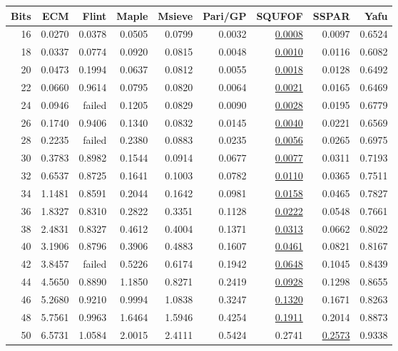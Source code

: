 \documentclass{ucalgthes1}
\theoremstyle{definition}
\begin{document}
\begin{table}[htb]
\centering
\begin{tabular}{| r | r | r | r | r | r | r | r | r |}
	\hline
Bits & ECM & Flint & Maple & Msieve & Pari/GP & SQUFOF & SSPAR & Yafu \\
	\hline
16 & 0.0270 & 0.0378 & 0.0505 & 0.0799 & 0.0032 & \underline{0.0008} & 0.0097 & 0.6524 \\
18 & 0.0337 & 0.0774 & 0.0920 & 0.0815 & 0.0048 & \underline{0.0010} & 0.0116 & 0.6082 \\
20 & 0.0473 & 0.1994 & 0.0637 & 0.0812 & 0.0055 & \underline{0.0018} & 0.0128 & 0.6492 \\
22 & 0.0660 & 0.9614 & 0.0795 & 0.0820 & 0.0064 & \underline{0.0021} & 0.0165 & 0.6469 \\
24 & 0.0946 & failed & 0.1205 & 0.0829 & 0.0090 & \underline{0.0028} & 0.0195 & 0.6779 \\
26 & 0.1740 & 0.9406 & 0.1340 & 0.0832 & 0.0145 & \underline{0.0040} & 0.0221 & 0.6569 \\
28 & 0.2235 & failed & 0.2380 & 0.0883 & 0.0235 & \underline{0.0056} & 0.0265 & 0.6975 \\
30 & 0.3783 & 0.8982 & 0.1544 & 0.0914 & 0.0677 & \underline{0.0077} & 0.0311 & 0.7193 \\
32 & 0.6537 & 0.8725 & 0.1641 & 0.1003 & 0.0782 & \underline{0.0110} & 0.0365 & 0.7511 \\
34 & 1.1481 & 0.8591 & 0.2044 & 0.1642 & 0.0981 & \underline{0.0158} & 0.0465 & 0.7827 \\
36 & 1.8327 & 0.8310 & 0.2822 & 0.3351 & 0.1128 & \underline{0.0222} & 0.0548 & 0.7661 \\
38 & 2.4831 & 0.8327 & 0.4612 & 0.4004 & 0.1371 & \underline{0.0313} & 0.0662 & 0.8022 \\
40 & 3.1906 & 0.8796 & 0.3906 & 0.4883 & 0.1607 & \underline{0.0461} & 0.0821 & 0.8167 \\
42 & 3.8457 & failed & 0.5226 & 0.6174 & 0.1942 & \underline{0.0648} & 0.1045 & 0.8439 \\
44 & 4.5650 & 0.8890 & 1.1850 & 0.8271 & 0.2419 & \underline{0.0928} & 0.1298 & 0.8655 \\
46 & 5.2680 & 0.9210 & 0.9994 & 1.0838 & 0.3247 & \underline{0.1320} & 0.1671 & 0.8263 \\
48 & 5.7561 & 0.9963 & 1.6464 & 1.5946 & 0.4254 & \underline{0.1911} & 0.2014 & 0.8873 \\
50 & 6.5731 & 1.0584 & 2.0015 & 2.4111 & 0.5424 & 0.2741 & \underline{0.2573} & 0.9338 \\

\end{tabular}
\end{table}
\end{document}
